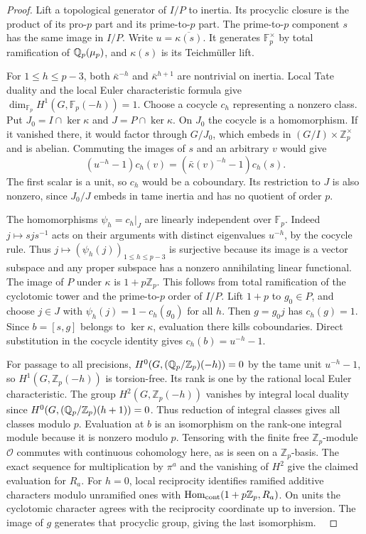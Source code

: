 \documentclass[a4paper,11pt]{article}
\theoremstyle{definition}
\theoremstyle{remark}
\numberwithin{equation}{section}
\begin{document}
\begin{proof}
Lift a topological generator of \(I/P\) to inertia. Its procyclic
closure is the product of its pro-\(p\) part and its
prime-to-\(p\) part. The prime-to-\(p\) component \(s\) has
the same image in \(I/P\). Write \(u=\overline{\kappa(s)}\).
It generates \(\mathbb F_p^\times\) by total ramification of
\(\mathbb Q_p(\mu_p)\), and \(\kappa(s)\) is its Teichm\"uller lift.

For \(1\le h\le p-3\), both \(\bar\kappa^{-h}\) and
\(\bar\kappa^{h+1}\) are nontrivial on inertia. Local Tate
duality and the local Euler characteristic formula give
\(\dim_{\mathbb F_p}H^1(G,\mathbb F_p(-h))=1\).
Choose a cocycle \(c_h\) representing a nonzero class.
Put \(J_0=I\cap\ker\kappa\) and \(J=P\cap\ker\kappa\). On
\(J_0\) the cocycle is a homomorphism. If it vanished there,
it would factor through \(G/J_0\), which embeds in
\((G/I)\times\mathbb Z_p^\times\) and is abelian. Commuting
the images of \(s\) and an arbitrary \(v\) would give
\[
 (u^{-h}-1)c_h(v)=(\bar\kappa(v)^{-h}-1)c_h(s).
\]
The first scalar is a unit, so \(c_h\) would be a coboundary.
Its restriction to \(J\) is also nonzero, since \(J_0/J\)
embeds in tame inertia and has no quotient of order \(p\).

The homomorphisms \(\psi_h=c_h|_J\) are linearly independent
over \(\mathbb F_p\). Indeed \(j\mapsto sjs^{-1}\) acts on their
arguments with distinct eigenvalues \(u^{-h}\), by the cocycle
rule. Thus \(j\mapsto(\psi_h(j))_{1\le h\le p-3}\) is surjective
because its image is a vector subspace and any proper subspace has a
nonzero annihilating linear functional. The image of \(P\) under
\(\kappa\) is \(1+p\mathbb Z_p\). This follows from total
ramification of the cyclotomic tower and the prime-to-\(p\)
order of \(I/P\). Lift \(1+p\) to \(g_0\in P\), and choose
\(j\in J\) with \(\psi_h(j)=1-c_h(g_0)\) for all \(h\).
Then \(g=g_0j\) has \(c_h(g)=1\). Since \(b=[s,g]\) belongs
to \(\ker\kappa\), evaluation there kills coboundaries. Direct
substitution in the cocycle identity gives \(c_h(b)=u^{-h}-1\).

For passage to all precisions, \(H^0(G,(\mathbb Q_p/\mathbb Z_p)(-h))=0\)
by the tame unit \(u^{-h}-1\), so \(H^1(G,\mathbb Z_p(-h))\)
is torsion-free. Its rank is one by the rational local Euler
characteristic. The group \(H^2(G,\mathbb Z_p(-h))\) vanishes
by integral local duality since
\(H^0(G,(\mathbb Q_p/\mathbb Z_p)(h+1))=0\). Thus reduction
of integral classes gives all classes modulo \(p\).
Evaluation at \(b\) is an isomorphism on the rank-one integral
module because it is nonzero modulo \(p\). Tensoring with the
finite free \(\mathbb Z_p\)-module \(\mathcal O\) commutes with
continuous cohomology here, as is seen on a \(\mathbb Z_p\)-basis.
The exact sequence for multiplication by \(\pi^a\) and the
vanishing of \(H^2\) give the claimed evaluation for \(R_a\).
For \(h=0\), local reciprocity identifies ramified additive
characters modulo unramified ones with
\(\operatorname{Hom}_{\rm cont}(1+p\mathbb Z_p,R_a)\).
On units the cyclotomic character agrees with the reciprocity
coordinate up to inversion. The image of \(g\) generates that
procyclic group, giving the last isomorphism.
~\cite[Chapter~I, \S2]{X-VII-localduality745}
\end{proof}
\end{document}
